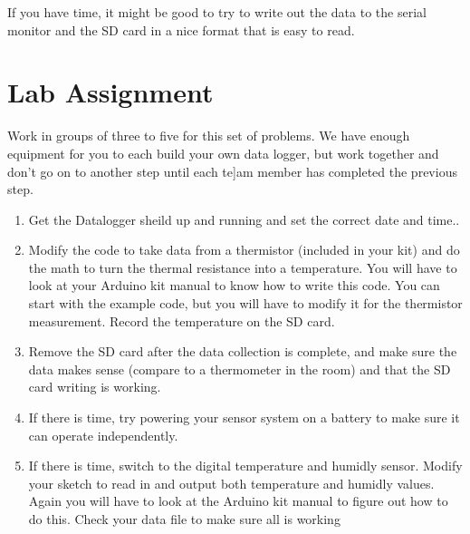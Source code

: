 If you have time, it might be good to try to write out the data to the serial monitor and the SD card in a nice format that is easy to read.

\section{Lab Assignment}
	
	Work in groups of three to five for this set of problems. We have enough equipment for you to each build your own data logger, but work together and don't go on to another step until each te]am member has completed the previous step.
	
	\begin{enumerate}
		\item Get the Datalogger sheild up and running and set the correct date and time..
		
		\item Modify the code to take data from a thermistor (included in your kit) and do the math to turn the thermal resistance into a temperature. You will have to look at your Arduino kit manual to know how to write this code. You can start with the example code, but you will have to modify it for the thermistor measurement. Record the temperature on the SD card.
		
		\item Remove the SD card after the data collection is complete, and make sure the data makes sense (compare to a thermometer in the room) and that the SD card writing is working.
		
		\item If there is time, try powering your sensor system on a battery to make sure it can operate independently.
		
		\item If there is time, switch to the digital temperature and humidly sensor. Modify your sketch to read in and output both temperature and humidly values. Again you will have to look at the Arduino kit manual to figure out how to do this. Check your data file to make sure all is working
	\end{enumerate}


